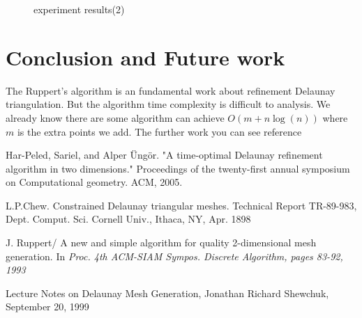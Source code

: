 \documentclass[letterpaper,12pt]{article}
\begin{document}
\begin{figure}[!htb]
  \centering




  \caption{experiment results(2)}
  \label{fig:cmp2}
\end{figure}



\section{Conclusion and Future work}
\label{sec:05}
The Ruppert's algorithm is an fundamental work about refinement Delaunay triangulation. But the
algorithm time complexity is difficult to analysis. We already know there are some algorithm can
achieve $O(m+n\log(n))$ where $m$ is the extra points we add. The further work you can see reference
\cite{Optimal} 


\begin{thebibliography}{99}

 Har-Peled, Sariel, and Alper \"{U}ng\"{o}r. "A time-optimal Delaunay refinement
algorithm in two dimensions."  Proceedings of the twenty-first annual symposium on Computational
geometry. ACM, 2005.

 L.P.Chew. Constrained Delaunay triangular meshes. Technical Report TR-89-983,
Dept. Comput. Sci. Cornell Univ., Ithaca, NY, Apr. 1898

 J. Ruppert/ A new and simple algorithm for quality 2-dimensional mesh
generation. In \emph{Proc. 4th ACM-SIAM Sympos. Discrete Algorithm, pages 83-92, 1993}

 Lecture Notes on Delaunay Mesh Generation, Jonathan Richard Shewchuk, September
20, 1999


\end{thebibliography}
\end{document}
